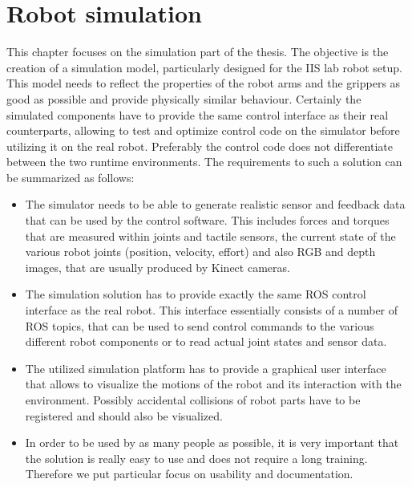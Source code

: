 
\chapter{Robot simulation}
\label{chap:simulation}

This chapter focuses on the simulation part of the thesis. The objective is the creation of a simulation model, particularly designed for the IIS lab robot setup. This model needs to reflect the properties of the robot arms and the grippers as good as possible and provide physically similar behaviour. Certainly the simulated components have to provide the same control interface as their real counterparts, allowing to test and optimize control code on the simulator before utilizing it on the real robot. Preferably the control code does not differentiate between the two runtime environments. The requirements to such a solution can be summarized as follows: 

\begin{itemize}

\item
The simulator needs to be able to generate realistic sensor and feedback data that can be used by the control software. This includes forces and torques that are measured within joints and tactile sensors, the current state of the various robot joints (position, velocity, effort) and also RGB and depth images, that are usually produced by Kinect cameras.

\item
The simulation solution has to provide exactly the same ROS control interface as the real robot. This interface essentially consists of a number of ROS topics, that can be used to send control commands to the various different robot components or to read actual joint states and sensor data.
 
\item
The utilized simulation platform has to provide a graphical user interface that allows to visualize the motions of the robot and its interaction with the environment. Possibly accidental collisions of  robot parts have to be registered and should also be visualized.

\item
In order to be used by as many people as possible, it is very important that the solution is really easy to use and does not require a long training. Therefore we put particular focus on usability and documentation.

\end{itemize}

